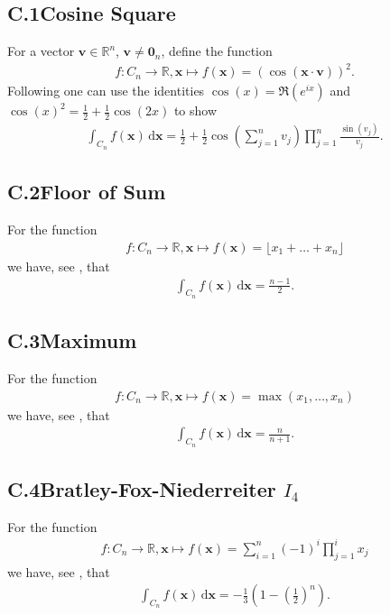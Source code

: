 \documentclass[11pt]{article}
\def\R{\mathbb{R}}
\def\bfx{\bm{x}}
\def\bfv{\bm{v}}
\def\d{\,\mathrm{d}}
\def\bx{\mathbf{x}}
\begin{document}
\subsection*{C.1\hspace{0.5cm}Cosine Square}
For a vector $\bfv\in\R^n$, $\bfv\neq \mathbf{0}_n$, define the function
\begin{align*}
f\colon C_{n}\to\R, \bx \mapsto f(\bx) = (\cos\left(\bfx\cdot\bfv\right))^2.
\end{align*}
Following \cite{IntegralCos2} one can use the identities $\cos(x)=\Re(e^{ix})$ and $\cos(x)^2 = \frac{1}{2}+\frac{1}{2}\cos(2x)$ to show
\begin{align*}
\int_{C_{n}} f(\bx) \d\bx =\frac{1}{2}+\frac{1}{2}\cos\left(\sum_{j=1}^{n}v_j\right)\prod_{j=1}^{n}\frac{\sin(v_j)}{v_j}.
\end{align*}
%
%
%
\subsection*{C.2\hspace{0.5cm}Floor of Sum}
For the function
\begin{align*}
f\colon C_{n}\to\R, \bx \mapsto f(\bx) = \lfloor x_1 + \ldots + x_n \rfloor
\end{align*}
we have, see \cite{IntegralFloorCube}, that
\begin{align*}
\int_{C_{n}} f(\bx) \d\bx = \frac{n-1}{2}.
\end{align*}
%
%
\subsection*{C.3\hspace{0.5cm}Maximum}
For the function
\begin{align*}
f\colon C_{n}\to\R, \bx \mapsto f(\bx) = \max(x_1,\ldots,x_n)
\end{align*}
we have, see \cite{IntegralCubeMax}, that
\begin{align*}
\int_{C_{n}} f(\bx) \d\bx = \frac{n}{n+1}.
\end{align*}
%
%
\subsection*{C.4\hspace{0.5cm}Bratley-Fox-Niederreiter $I_4$}
For the function
\begin{align*}
f\colon C_{n}\to\R, \bx \mapsto f(\bx) = \sum^{n}_{i=1} (-1)^i \prod_{j=1}^{i} x_j
\end{align*}
we have, see \cite{BratleyFoxNiederreiter1992}, that
\begin{align*}
\int_{C_{n}} f(\bx) \d\bx = -\frac{1}{3}\left(1-\left(\frac{1}{2}\right)^n\right).
\end{align*}
%
%
%
%
%
%
\end{document}
